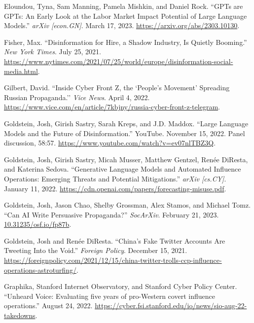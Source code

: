 \documentclass{article}
\begin{document}
\begin{thebibliography}{9}
  Eloundou, Tyna, Sam Manning, Pamela Mishkin, and Daniel Rock. ``GPTs are GPTs: An Early Look at the Labor Market Impact Potential of Large Language Models.'' \textit{arXiv [econ.GN]}. March 17, 2023. \href{https://arxiv.org/abs/2303.10130}{https://arxiv.org/abs/2303.10130}.

  Fisher, Max. ``Disinformation for Hire, a Shadow Industry, Is Quietly Booming.'' \textit{New York Times}. July 25, 2021. \href{https://www.nytimes.com/2021/07/25/world/europe/disinformation-social-media.html}{https://www.nytimes.com/2021/07/25/world/europe/disinformation-social-media.html}. 

  Gilbert, David. ``Inside Cyber Front Z, the `People's Movement’ Spreading Russian Propaganda.'' \textit{Vice News}. April 4, 2022. \href{https://www.vice.com/en/article/7kbjny/russia-cyber-front-z-telegram}{https://www.vice.com/en/article/7kbjny/russia-cyber-front-z-telegram}.

  Goldstein, Josh, Girish Sastry, Sarah Kreps, and J.D. Maddox. ``Large Language Models and the Future of Disinformation.'' YouTube. November 15, 2022. Panel discussion, 58:57. \href{https://www.youtube.com/watch?v=ev07nlTBZ3Q}{https://www.youtube.com/watch?v=ev07nlTBZ3Q}.

  Goldstein, Josh, Girish Sastry, Micah Musser, Matthew Gentzel, Renée DiResta, and Katerina Sedova. ``Generative Language Models and Automated Influence Operations: Emerging Threats and Potential Mitigations.'' \textit{arXiv [cs.CY]}. January 11, 2022. \href{https://cdn.openai.com/papers/forecasting-misuse.pdf}{https://cdn.openai.com/papers/forecasting-misuse.pdf}.

  Goldstein, Josh, Jason Chao, Shelby Grossman, Alex Stamos, and Michael Tomz. ``Can AI Write Persuasive Propaganda?'' \textit{SocArXiv}. February 21, 2023. \href{10.31235/osf.io/fp87b}{10.31235/osf.io/fp87b}.

  Goldstein, Josh and Renée DiResta. ``China's Fake Twitter Accounts Are Tweeting Into the Void.'' \textit{Foreign Policy}. December 15, 2021. \href{https://foreignpolicy.com/2021/12/15/china-twitter-trolls-ccp-influence-operations-astroturfing/}{https://foreignpolicy.com/2021/12/15/china-twitter-trolls-ccp-influence-operations-astroturfing/}. 

  Graphika, Stanford Internet Observatory, and Stanford Cyber Policy Center. ``Unheard Voice: Evaluating five years of pro-Western covert influence operations.'' August 24, 2022. \href{https://cyber.fsi.stanford.edu/io/news/sio-aug-22-takedowns}{https://cyber.fsi.stanford.edu/io/news/sio-aug-22-takedowns}.


\end{thebibliography}
\end{document}
